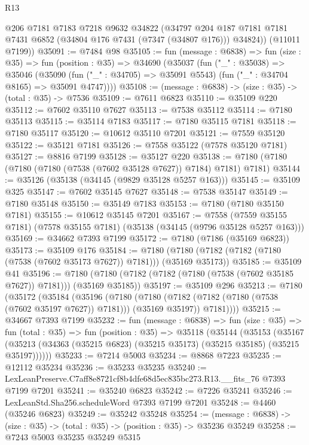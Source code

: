 \begin{lexlean}{R13}
\begin{coremodule}
        @206
        @7181
        @7183
        @7218
        @9632
        @34822
        (@34797 @204 @187 @7181 @7181 @7431 @6852 (@34804 @176 @7431 (@7347 (@34807 @176))) @34824))
      (@11011 @7199))
@35091 := @7484 @98
@35105 := fun (message : @6838) =>
  fun (size : @35) =>
  fun (position : @35) =>
  @34690
    (@35037
      (fun ("_" : @35038) =>
      @35046
        (@35090 (fun ("_" : @34705) => @35091 @5543) (fun ("_" : @34704 @8165) => @35091 @4747))))
@35108 := (message : @6838) -> (size : @35) -> (total : @35) -> @7536
@35109 := @7611 @6823
@35110 := @35109 @220
@35112 := @7602 @35110 @7627
@35113 := @7538 @35112
@35114 := @7180 @35113
@35115 := @35114 @7183
@35117 := @7180 @35115 @7181
@35118 := @7180 @35117
@35120 := @10612 @35110 @7201
@35121 := @7559 @35120
@35122 := @35121 @7181
@35126 := @7558 @35122 (@7578 @35120 @7181)
@35127 := @8816 @7199
@35128 := @35127 @220
@35138 := @7180 (@7180 (@7180 (@7180 (@7538 (@7602 @35128 @7627)) @7184) @7181) @7181)
@35144 := @35126 (@35138 (@34145 (@9829 @35128 @5257 @163)))
@35145 := @35109 @325
@35147 := @7602 @35145 @7627
@35148 := @7538 @35147
@35149 := @7180 @35148
@35150 := @35149 @7183
@35153 := @7180 (@7180 @35150 @7181)
@35155 := @10612 @35145 @7201
@35167 := @7558
    (@7559 @35155 @7181)
    (@7578 @35155 @7181)
    (@35138 (@34145 (@9796 @35128 @5257 @163)))
@35169 := @34662 @7393 @7199
@35172 := @7180 (@7186 (@35169 @6823))
@35173 := @35109 @176
@35184 := @7180 (@7180 (@7182 (@7182 (@7180 (@7538 (@7602 @35173 @7627)) @7181))) (@35169 @35173))
@35185 := @35109 @41
@35196 := @7180 (@7180 (@7182 (@7182 (@7180 (@7538 (@7602 @35185 @7627)) @7181))) (@35169 @35185))
@35197 := @35109 @296
@35213 := @7180
    (@35172
      (@35184
        (@35196
          (@7180
            (@7180 (@7182 (@7182 (@7180 (@7538 (@7602 @35197 @7627)) @7181))) (@35169 @35197))
            @7181))))
@35215 := @34667 @7393 @7199
@35232 := fun (message : @6838) =>
  fun (size : @35) =>
  fun (total : @35) =>
  fun (position : @35) =>
  @35118
    (@35144
      (@35153
        (@35167 (@35213 (@34363 (@35215 @6823) (@35215 @35173) (@35215 @35185) (@35215 @35197))))))
@35233 := @7214 @5003
@35234 := @8868 @7223
@35235 := @12112 @35234
@35236 := @35233 @35235
@35240 := LexLeanPreserve.C7aff8e8721cf8b4dfe68d5ec835bc273.R13.__fits_76 @7393 @7199 @7201
@35241 := @35240 @6823
@35242 := @7226 @35241
@35246 := LexLeanStd.Sha256.scheduleWord @7393 @7199 @7201
@35248 := @4460 (@35246 @6823)
@35249 := @35242 @35248
@35254 := (message : @6838) -> (size : @35) -> (total : @35) -> (position : @35) -> @35236 @35249
@35258 := @7243 @5003 @35235 @35249 @5315

\end{coremodule}
\end{lexlean}
